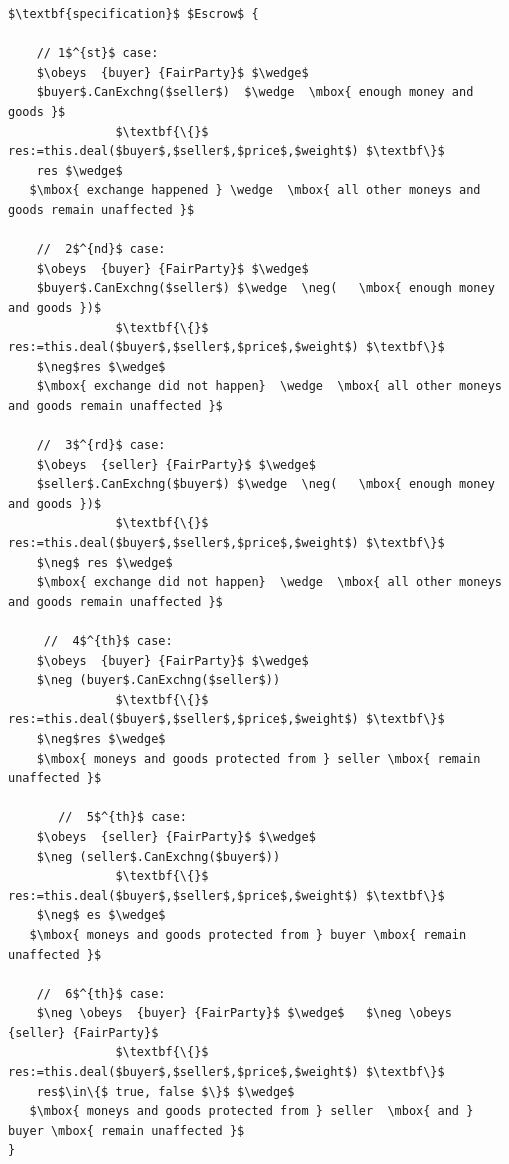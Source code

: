  \begin{lstlisting}[mathescape=true, language=Chainmail, frame=lines]
$\textbf{specification}$ $Escrow$ {
    
    // 1$^{st}$ case:
    $\obeys  {buyer} {FairParty}$ $\wedge$ 
    $buyer$.CanExchng($seller$)  $\wedge  \mbox{ enough money and goods }$  
               $\textbf{\{}$ res:=this.deal($buyer$,$seller$,$price$,$weight$) $\textbf\}$
    res $\wedge$
   $\mbox{ exchange happened } \wedge  \mbox{ all other moneys and goods remain unaffected }$
   
    //  2$^{nd}$ case:
    $\obeys  {buyer} {FairParty}$ $\wedge$ 
    $buyer$.CanExchng($seller$) $\wedge  \neg(   \mbox{ enough money and goods })$  
               $\textbf{\{}$ res:=this.deal($buyer$,$seller$,$price$,$weight$) $\textbf\}$
    $\neg$res $\wedge$
    $\mbox{ exchange did not happen}  \wedge  \mbox{ all other moneys and goods remain unaffected }$
    
    //  3$^{rd}$ case:
    $\obeys  {seller} {FairParty}$ $\wedge$ 
    $seller$.CanExchng($buyer$) $\wedge  \neg(   \mbox{ enough money and goods })$  
               $\textbf{\{}$ res:=this.deal($buyer$,$seller$,$price$,$weight$) $\textbf\}$
    $\neg$ res $\wedge$
    $\mbox{ exchange did not happen}  \wedge  \mbox{ all other moneys and goods remain unaffected }$
    
     //  4$^{th}$ case:
    $\obeys  {buyer} {FairParty}$ $\wedge$ 
    $\neg (buyer$.CanExchng($seller$))  
               $\textbf{\{}$ res:=this.deal($buyer$,$seller$,$price$,$weight$) $\textbf\}$
    $\neg$res $\wedge$
    $\mbox{ moneys and goods protected from } seller \mbox{ remain unaffected }$   
    
       //  5$^{th}$ case:
    $\obeys  {seller} {FairParty}$ $\wedge$ 
    $\neg (seller$.CanExchng($buyer$))  
               $\textbf{\{}$ res:=this.deal($buyer$,$seller$,$price$,$weight$) $\textbf\}$
    $\neg$ es $\wedge$
   $\mbox{ moneys and goods protected from } buyer \mbox{ remain unaffected }$   
 
    //  6$^{th}$ case:
    $\neg \obeys  {buyer} {FairParty}$ $\wedge$   $\neg \obeys  {seller} {FairParty}$ 
               $\textbf{\{}$ res:=this.deal($buyer$,$seller$,$price$,$weight$) $\textbf\}$
    res$\in\{$ true, false $\}$ $\wedge$
   $\mbox{ moneys and goods protected from } seller  \mbox{ and } buyer \mbox{ remain unaffected }$   
}
\end{lstlisting}
